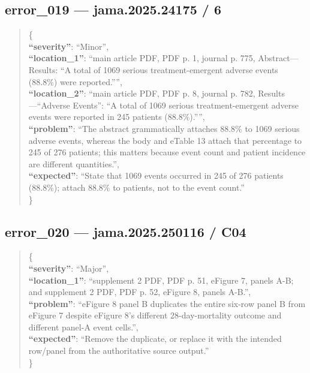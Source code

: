 \documentclass[
  letterpaper,
  9pt]{extreport}
\begin{document}
\hypertarget{error_019--jama202524175--6}{%
\subsection{error\_019 --- jama.2025.24175 /
6}\label{error_019--jama202524175--6}}

\begin{quote}
\{\\
\textbf{``severity''}: ``Minor'',\\
\textbf{``location\_1''}: ``main article PDF, PDF p. 1, journal p. 775,
Abstract---Results: ``A total of 1069 serious treatment-emergent adverse
events (88.8\%) were reported.'''',\\
\textbf{``location\_2''}: ``main article PDF, PDF p. 8, journal p. 782,
Results---``Adverse Events'': ``A total of 1069 serious
treatment-emergent adverse events were reported in 245 patients
(88.8\%).'''',\\
\textbf{``problem''}: ``The abstract grammatically attaches 88.8\% to
1069 serious adverse events, whereas the body and eTable 13 attach that
percentage to 245 of 276 patients; this matters because event count and
patient incidence are different quantities.'',\\
\textbf{``expected''}: ``State that 1069 events occurred in 245 of 276
patients (88.8\%); attach 88.8\% to patients, not to the event
count.''\\
\}
\end{quote}

\hypertarget{error_020--jama2025250116--c04}{%
\subsection{error\_020 --- jama.2025.250116 /
C04}\label{error_020--jama2025250116--c04}}

\begin{quote}
\{\\
\textbf{``severity''}: ``Major'',\\
\textbf{``location\_1''}: ``supplement 2 PDF, PDF p. 51, eFigure 7,
panels A-B; and supplement 2 PDF, PDF p. 52, eFigure 8, panels A-B.'',\\
\textbf{``problem''}: ``eFigure 8 panel B duplicates the entire six-row
panel B from eFigure 7 despite eFigure 8's different 28-day-mortality
outcome and different panel-A event cells.'',\\
\textbf{``expected''}: ``Remove the duplicate, or replace it with the
intended row/panel from the authoritative source output.''\\
\}
\end{quote}
\end{document}
